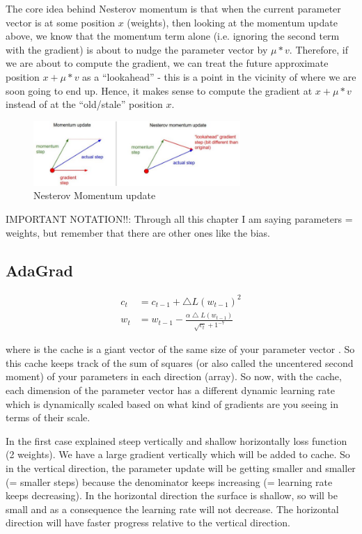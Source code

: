 The core idea behind Nesterov momentum is that when the current parameter vector is at some position $x$ (weights), then looking at the momentum update above, we know that the momentum term alone (i.e. ignoring the second term with the gradient) is about to nudge the parameter vector by $\mu * v$. Therefore, if we are about to compute the gradient, we can treat the future approximate position $x + \mu * v$ as a “lookahead” - this is a point in the vicinity of where we are soon going to end up. Hence, it makes sense to compute the gradient at $x + \mu * v$ instead of at the “old/stale” position $x$.

\begin{figure}[h]
  \centering
  \includegraphics[width=0.7\textwidth]{Images/params_up/2.png}
  \caption{Nesterov Momentum update}
\end{figure}

IMPORTANT NOTATION!!: Through all this chapter I am saying parameters = weights, but remember that there are other ones like the bias.

\subsection*{AdaGrad} 
\begin{equation}
\begin{aligned}
c_t &= c_{t-1} + \bigtriangleup L(w_{t-1})^2 \\
w_t &= w_{t-1} - \frac{\alpha  \bigtriangleup L(w_{t-1})}{\sqrt{c_t} + 1^{-7}}
\end{aligned}
\end{equation}

where  is the cache is a giant vector of the same size of your parameter vector . So this cache keeps track of the sum of squares (or also called the uncentered second moment) of your parameters in each direction (array). So now, with the cache, each dimension of the parameter vector has a different dynamic learning rate which is dynamically scaled based on what kind of gradients are you seeing in terms of their scale.

In the first case explained steep vertically and shallow horizontally loss function (2 weights). We have a large gradient vertically which will be added to cache. So in the vertical direction, the parameter update will be getting smaller and smaller (= smaller steps) because the denominator keeps increasing (= learning rate keeps decreasing). In the horizontal direction the surface is shallow, so  will be small and as a consequence the learning rate will not decrease.  The horizontal direction will have faster progress relative to the vertical direction.

